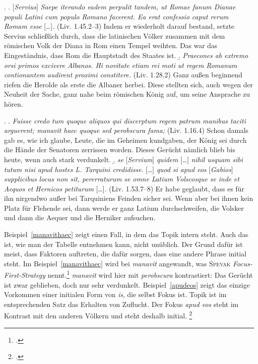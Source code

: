 \documentclass[12pt]{article}
\newcommand{\lat}[1]{\textit{#1}} %
\newcommand{\cntrl}[1]{#1} %
\begin{document}
\ex.
\a.
\label{eaconfessio}
[\lat{Servius}] \lat{Saepe iterando eadem perpulit tandem, ut Romae fanum Dianae populi Latini cum populo Romano facerent. Ea erat confessio caput rerum Romam esse }[\ldots]\lat{.} (Liv. 1.45.2--3)
\trans Indem er wiederholt darauf bestand, setzte Servius schließlich durch, dass die latinischen Völker zusammen mit dem römischen Volk der Diana in Rom einen Tempel weihten. Das war das \cntrl{Eingeständnis}, dass Rom die Hauptstadt des Staates ist.
\b.
\label{himoti}
\lat{Praecones ab extremo orsi primos excivere Albanos. Hi novitate etiam rei moti ut regem Romanum contionantem audirent proximi constitere.} (Liv. 1.28.2)
\trans Ganz außen beginnend riefen die Herolde als erste die Albaner herbei. Diese stellten sich, auch wegen der Neuheit der Sache, ganz nahe beim römischen König auf, um seine Ansprache zu hören.

\ex.
\a.
\label{manavithaec}
\lat{Fuisse credo tum quoque aliquos qui discerptum regem patrum manibus taciti arguerent; manavit haec quoque sed perobscura fama;} (Liv. 1.16.4)
\trans Schon damals gab es, wie ich glaube, Leute, die im Geheimen kundgaben, der König sei durch die Hände der Senatoren zerrissen worden. Dieses Gerücht nämlich blieb bis heute, wenn auch stark verdunkelt.
\b.
\label{apudeos}
\lat{se} [\lat{Servium}] \lat{quidem} [\ldots] \lat{nihil usquam sibi tutum nisi apud hostes L. Tarquini credidisse.} [\ldots] \lat{quod si apud eos} [\lat{Gabios}] \lat{supplicibus locus non sit, pererraturum se omne Latium Volscosque se inde et Aequos et Hernicos petiturum} [\ldots]\lat{.} (Liv. 1.53.7--8)
\trans Er habe geglaubt, dass es für ihn nirgendwo außer bei Tarquiniens Feinden sicher sei. Wenn aber bei ihnen kein Platz für Flehende sei, dann werde er ganz Latium durchschweifen, die Volsker und dann die Aequer und die Herniker aufsuchen.

Beispiel~\ref{manavithaec} zeigt einen Fall, in dem das Topik intern steht. Auch das ist, wie man der Tabelle entnehmen kann, nicht unüblich.
Der Grund dafür ist meist, dass Faktoren auftreten, die dafür sorgen, dass eine andere Phrase initial steht.
Im Beispiel~\ref{manavithaec} wird bei \lat{manavit} angewandt, was \textsc{Spevak} \emph{Focus-First-Strategy} nennt.\footcite[S.\,41]{spevak}
\lat{manavit} wird hier mit \lat{perobscura} kontrastiert: Das Gerücht ist zwar geblieben, doch nur sehr verdunkelt.
Beispiel~\ref{apudeos} zeigt das einzige Vorkommen einer initialen Form von \lat{is}, die selbst Fokus ist. Topik ist im entsprechenden Satz das Erhalten von Zuflucht. Der Fokus \lat{apud eos} steht im Kontrast mit den anderen Völkern und steht deshalb initial.
\footcite[\textsc{De Jong} nennt als Konstituenten, die initiale Stellung bevorzugen, anaphorische Pronomina, topikale und kontrastive Konstituenten und Konstituenten, die Emphase tragen oder den Situationsrahmen beschreiben.][{}]{dejong89}
\end{document}

